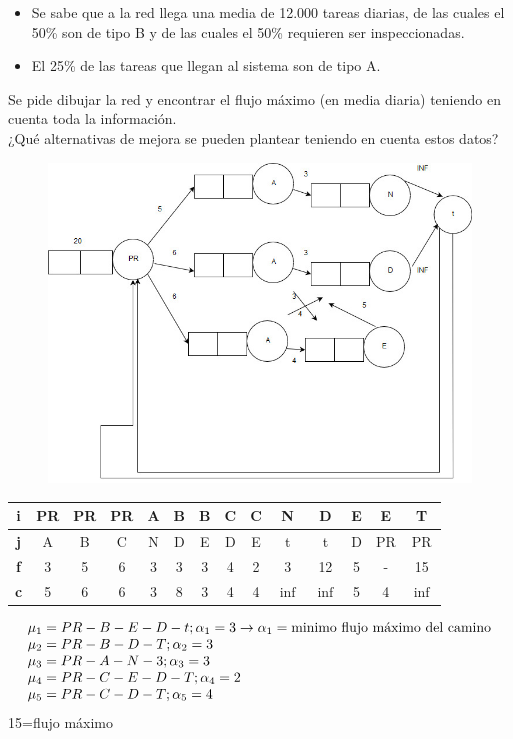 \begin{itemize}
    \item Se sabe que a la red llega una media de 12.000 tareas diarias, de las cuales el 50\% son de tipo B y de las cuales el 50\% requieren ser inspeccionadas.
    \item El 25\% de las tareas que llegan al sistema son de tipo A.
\end{itemize}

Se  pide  dibujar  la  red  y  encontrar  el  flujo  máximo  (en  media  diaria)  teniendo  en  cuenta  toda  la información.\\
¿Qué alternativas de mejora se pueden plantear teniendo en cuenta estos datos?

\begin{tcolorbox}[colback=white,colframe=cyan!50!black,fonttitle=\bfseries]
\begin{figure}[H]
    \centering
    \includegraphics[width=\textwidth]{Images/412.jpg}
\end{figure}
\begin{table}[H]
\centering
\begin{tabular}{|c|c|c|c|c|c|c|c|c|c|c|c|c|c|}
\hline
\textbf{i} & PR & PR & PR & A & B & B & C & C & N   & D   & E & E  & T   \\ \hline
\textbf{j} & A  & B  & C  & N & D & E & D & E & t   & t   & D & PR & PR  \\ \hline
\textbf{f} & 3  & 5  & 6  & 3 & 3 & 3 & 4 & 2 & 3   & 12  & 5 & -  & 15  \\ \hline
\textbf{c} & 5  & 6  & 6  & 3 & 8 & 3 & 4 & 4 & $\inf$ & $\inf$ & 5 & 4  & $\inf$ \\ \hline
\end{tabular}
\end{table}
\[\left.\begin{array}{lllll}
\mu_1=PR-B-E-D-t; \alpha_1=3\rightarrow\alpha_1=\text{minimo flujo máximo del camino}\\
\mu_2=PR-B-D-T; \alpha_2=3\\
\mu_3=PR-A-N-3; \alpha_3=3\\
\mu_4=PR-C-E-D-T; \alpha_4=2\\
\mu_5=PR-C-D-T; \alpha_5=4
\end{array}\right.
\]
15=flujo máximo
\end{tcolorbox}